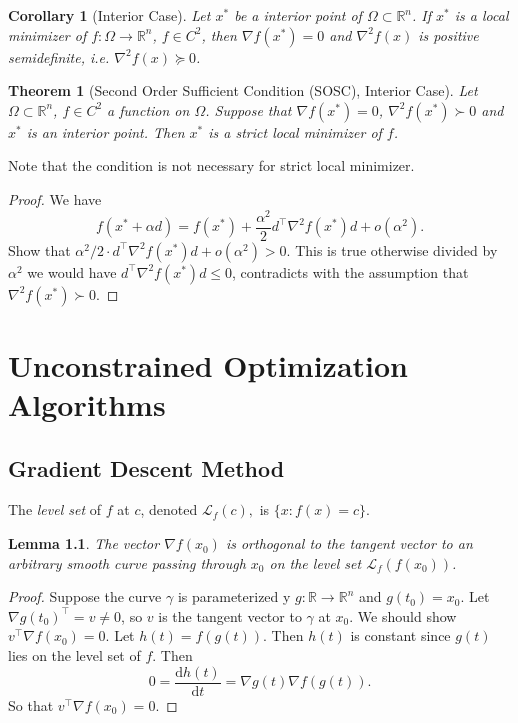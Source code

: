 \documentclass[12pt,a4paper]{report}
\numberwithin{equation}{section}
\theoremstyle{mystyle}
\newtheorem{theorem}[definition]{Theorem}
\newtheorem{lemma}[definition]{Lemma}
\newtheorem{corollary}[definition]{Corollary}
\newcommand{\R}{\mathbb{R}}
\newcommand{\grad}{\nabla}
\renewcommand{\d}{\mathrm{d}}
\newcommand{\T}{\top}
\begin{document}
	\begin{corollary}[Interior Case]
		Let $x^*$ be a interior point of $\Omega\subset \R^n$. If $x^*$ is a local minimizer of $f:\Omega\to \R^n$, $f\in C^2$, then $\grad f(x^*)=0$ and $\grad^2 f(x)$ is positive semidefinite, i.e. $\grad^2 f(x)\succeq 0$.
	\end{corollary}
	
	\begin{theorem}[Second Order Sufficient Condition (SOSC), Interior Case]
		Let $\Omega\subset \R^n$, $f\in C^2$ a function on $\Omega$. Suppose that $\grad f(x^*)=0$, $\grad^2f(x^*)\succ 0$ and $x^*$ is an interior point. Then $x^*$ is a strict local minimizer of $f$.
	\end{theorem}
	Note that the condition is not necessary for strict local minimizer.
	\begin{proof}
		We have
		$$
		f(x^*+\alpha d)=f(x^*)+\frac{\alpha^2}{2}d^\T \grad^2 f(x^*)d+o(\alpha^2).
		$$
		Show that $\alpha^2/2 \cdot d^\T \grad^2 f(x^*)d+o(\alpha^2)>0$. This is true otherwise divided by $\alpha^2$ we would have $d^\T \grad^2 f(x^*)d\leq 0$, contradicts with the assumption that $\grad^2 f(x^*)\succ 0$.
	\end{proof}



	\chapter{Unconstrained Optimization Algorithms}
	\section{Gradient Descent Method}
	The \emph{level set} of $f$ at $c$, denoted $\mathcal{L}_f(c),$ is $\{x:f(x)=c\}$.
	\begin{lemma}
		The vector $\grad f(x_0)$ is orthogonal to the tangent vector to an arbitrary smooth curve passing through $x_0$ on the level set $\mathcal{L}_f(f(x_0))$.
	\end{lemma}
	\begin{proof}
		Suppose the curve $\gamma$ is parameterized y $g:\R\to\R^n$ and $g(t_0)=x_0$. Let $\grad g(t_0)^\T=v\neq 0$, so $v$ is the tangent vector to $\gamma$ at $x_0$. We should show $v^\T \grad f(x_0)=0$. Let $h(t)=f(g(t))$. Then $h(t)$ is constant since $g(t)$ lies on the level set of $f$. Then 
		$$
		0=\frac{\d h(t)}{\d t}=\grad g(t)\grad f(g(t)).
		$$
		So that $v^\T\grad f(x_0)=0$.
	\end{proof}
\end{document}
